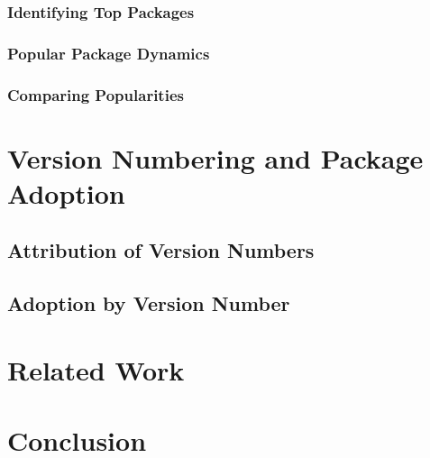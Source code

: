 \documentclass[10pt,conference]{IEEEtran}
\begin{document}
\subsubsection{Identifying Top Packages}

\subsubsection{Popular Package Dynamics}

\subsubsection{Comparing Popularities}

\section{Version Numbering and Package Adoption}

\subsection{Attribution of Version Numbers}

\subsection{Adoption by Version Number}

\section{Related Work}

\section{Conclusion}
\end{document}
